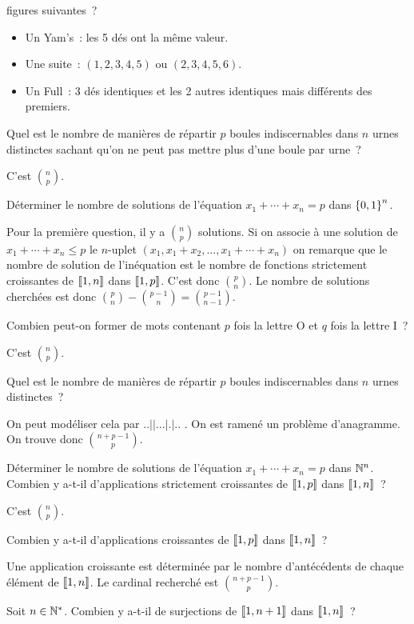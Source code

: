 \documentclass{magnolia}
\begin{document}
\begin{exos}
  figures suivantes~?
  \begin{itemize}
  \item Un Yam's~: les 5 dés ont la même valeur.
  \item Une suite~: $(1,2,3,4,5)$ ou $(2,3,4,5,6)$.
  \item Un Full~: 3 dés identiques et les 2 autres identiques mais différents des premiers.
  \end{itemize}
\exo Quel est le nombre de manières de répartir $p$ boules indiscernables
dans $n$ urnes distinctes sachant qu'on ne peut pas mettre plus d'une boule par urne~?
  \begin{sol}
  C'est $\binom{n}{p}$.
  \end{sol}  
\exo Déterminer le nombre de solutions de l'équation $x_1+\cdots+x_n=p$ dans
  $\left\{0,1\right\}^n$.
  \begin{sol}
  Pour la première question, il y a $\binom{n}{p}$ solutions. Si on associe
  à une solution de $x_1+\cdots+x_n\leq p$ le $n$-uplet
  $(x_1,x_1+x_2,\ldots,x_1+\cdots+x_n)$ on remarque que le nombre de solution
  de l'inéquation est le nombre de fonctions strictement croissantes de
  $\left\llbracket 1,n\right\rrbracket$ dans $\left\llbracket 1,p\right\rrbracket$. C'est donc $\binom{p}{n}$. Le nombre
  de solutions cherchées est donc
  $\binom{p}{n}-\binom{p-1}{n}=\binom{p-1}{n-1}$.
  \end{sol}
\exo Combien peut-on former de mots contenant $p$ fois
  la lettre O et $q$ fois la lettre I~?
  \begin{sol}
  C'est $\binom{n}{p}$.
  \end{sol}
\exo Quel est le nombre de manières de répartir $p$ boules indiscernables
  dans $n$ urnes distinctes~?
  \begin{sol}
  On peut modéliser cela par \og $..||...|.|..$ \fg. On est ramené un problème
  d'anagramme. On trouve donc $\binom{n+p-1}{p}$.
  \end{sol}
\exo Déterminer le nombre de solutions de l'équation $x_1+\cdots+x_n=p$ dans
  $\mathbb{N}^n$.
\exo Combien y a-t-il d'applications strictement
  croissantes de $\left\llbracket 1,p\right\rrbracket$ dans $\left\llbracket 1,n\right\rrbracket$~?
  \begin{sol}
  C'est $\binom{n}{p}$.
  \end{sol}
\exo Combien y a-t-il d'applications croissantes de $\left\llbracket 1,p\right\rrbracket$ dans $\left\llbracket 1,n\right\rrbracket$~?
  \begin{sol}
  Une application croissante est déterminée par le nombre d'antécédents de
  chaque élément de $\left\llbracket 1,n\right\rrbracket$. Le cardinal recherché est
  $\binom{n+p-1}{p}$.
  \end{sol}
\exo Soit $n\in{\mathbb{N}^*}$. Combien y a-t-il de surjections de $\left\llbracket 1,n+1\right\rrbracket$
  dans $\left\llbracket 1,n\right\rrbracket$~?
\end{exos}
\end{document}
